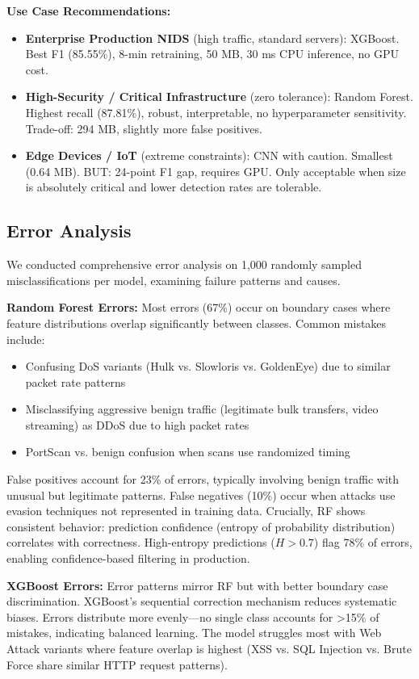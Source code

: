 \documentclass[10pt,twocolumn]{article}
\begin{document}
\textbf{Use Case Recommendations:}
\begin{itemize}
    \item \textbf{Enterprise Production NIDS} (high traffic, standard servers): XGBoost. Best F1 (85.55\%), 8-min retraining, 50 MB, 30 ms CPU inference, no GPU cost.
    \item \textbf{High-Security / Critical Infrastructure} (zero tolerance): Random Forest. Highest recall (87.81\%), robust, interpretable, no hyperparameter sensitivity. Trade-off: 294 MB, slightly more false positives.
    \item \textbf{Edge Devices / IoT} (extreme constraints): CNN with caution. Smallest (0.64 MB). BUT: 24-point F1 gap, requires GPU. Only acceptable when size is absolutely critical and lower detection rates are tolerable.
\end{itemize}


\subsection{Error Analysis}

We conducted comprehensive error analysis on 1,000 randomly sampled misclassifications per model, examining failure patterns and causes.

\textbf{Random Forest Errors:} Most errors (67\%) occur on boundary cases where feature distributions overlap significantly between classes. Common mistakes include:
\begin{itemize}
    \item Confusing DoS variants (Hulk vs. Slowloris vs. GoldenEye) due to similar packet rate patterns
    \item Misclassifying aggressive benign traffic (legitimate bulk transfers, video streaming) as DDoS due to high packet rates
    \item PortScan vs. benign confusion when scans use randomized timing
\end{itemize}

False positives account for 23\% of errors, typically involving benign traffic with unusual but legitimate patterns. False negatives (10\%) occur when attacks use evasion techniques not represented in training data. Crucially, RF shows consistent behavior: prediction confidence (entropy of probability distribution) correlates with correctness. High-entropy predictions ($H > 0.7$) flag 78\% of errors, enabling confidence-based filtering in production.

\textbf{XGBoost Errors:} Error patterns mirror RF but with better boundary case discrimination. XGBoost's sequential correction mechanism reduces systematic biases. Errors distribute more evenly---no single class accounts for >15\% of mistakes, indicating balanced learning. The model struggles most with Web Attack variants where feature overlap is highest (XSS vs. SQL Injection vs. Brute Force share similar HTTP request patterns).
\end{document}
